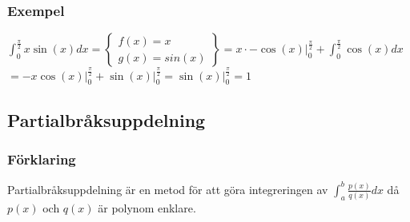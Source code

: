 \documentclass{article}
\begin{document}
\subsubsection{Exempel}
${\displaystyle \int_{0}^{\frac{\pi}{2}}x\sin(x)dx=\left\{\begin{array}{l}
   f(x)=x   \\
   g(x)=sin(x)
\end{array}
\right\} = x \cdot-\cos(x)\bigg\vert_{0}^{\frac{\pi}{2}} + \int_{0}^{\frac{\pi}{2}}\cos(x)dx}$ \\
$= -x\cos(x)\bigg\vert_{0}^{\frac{\pi}{2}} + \sin(x)\bigg\vert_{0}^{\frac{\pi}{2}} = \sin(x)\bigg\vert_{0}^{\frac{\pi}{2}}=1$

\subsection{Partialbråksuppdelning}
\subsubsection{Förklaring}
Partialbråksuppdelning är en metod för att göra integreringen av ${\displaystyle\int_{a}^{b}\frac{p(x)}{q(x)}dx }$ då $p(x)$ och $q(x)$ är polynom enklare.
\end{document}
